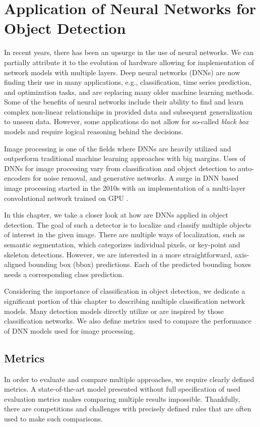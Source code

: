 \chapter{Application of Neural Networks for Object Detection}
\label{chap:nns}
In recent years, there has been an upsurge in the use of neural networks. We can partially attribute it to the evolution of hardware allowing for implementation of network models with multiple layers. Deep neural networks (DNNs) are now finding their use in many applications, e.g., classification, time series prediction, and optimization tasks, and are replacing many older machine learning methods. Some of the benefits of neural networks include their ability to find and learn complex non-linear relationships in provided data and subsequent generalization to unseen data. However, some applications do not allow for so-called \textit{black box} models and require logical reasoning behind the decisions.

Image processing is one of the fields where DNNs are heavily utilized and outperform traditional machine learning approaches with big margins. Uses of DNNs for image processing vary from classification and object detection to auto-encoders for noise removal, and generative networks. A surge in DNN based image processing started in the 2010s with an implementation of a multi-layer convolutional network trained on GPU \cite{bib:deepOnGpu}. 

In this chapter, we take a closer look at how are DNNs applied in object detection. The goal of such a detector is to localize and classify multiple objects of interest in the given image. There are multiple ways of localization, such as semantic segmentation, which categorizes individual pixels, or key-point and skeleton detections. However, we are interested in a more straightforward, axis-aligned bounding box (bbox) predictions. Each of the predicted bounding boxes needs a corresponding class prediction.

Considering the importance of classification in object detection, we dedicate a significant portion of this chapter to describing multiple classification network models. Many detection models directly utilize or are inspired by those classification networks. We also define metrics used to compare the performance of DNN models used for image processing.

\section{Metrics}
In order to evaluate and compare multiple approaches, we require clearly defined metrics. A state-of-the-art model presented without full specification of used evaluation metrics makes comparing multiple results impossible. Thankfully, there are competitions and challenges with precisely defined rules that are often used to make such comparisons. 

